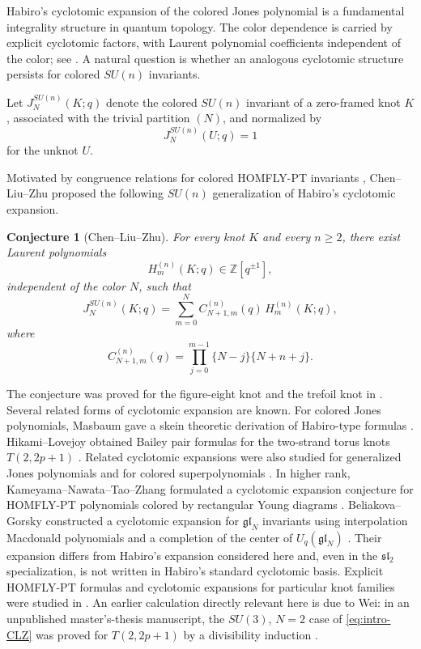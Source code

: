 \documentclass[11pt]{amsart}
\newtheorem{conjecture}[theorem]{Conjecture}
\begin{document}
Habiro's cyclotomic expansion of the colored Jones polynomial is a
fundamental integrality structure in quantum topology. 
The color dependence is carried by explicit cyclotomic factors, with
Laurent polynomial coefficients independent of the color; 
see \cite{HabiroSL2,HabiroCyclotomic,Habiro,HabiroLe}.
A natural question is whether an analogous cyclotomic structure persists
for colored \(SU(n)\) invariants.

Let \(J_N^{SU(n)}(K;q)\) denote the
colored \(SU(n)\) invariant of a zero-framed knot \(K\), associated with the
trivial partition \((N)\), and normalized by
\[
J_N^{SU(n)}(U;q)=1
\]
for the unknot \(U\).  

Motivated by congruence relations for colored HOMFLY-PT invariants \cite{CLPZ,ZhuStructures},
Chen--Liu--Zhu proposed the following \(SU(n)\) generalization of
Habiro's cyclotomic expansion.

\begin{conjecture}[Chen--Liu--Zhu]\label{conj:CLZ}
For every knot \(K\) and every \(n\geq2\), there exist Laurent polynomials
\[
H_m^{(n)}(K;q)\in\mathbb Z[q^{\pm1}],
\]
independent of the color \(N\), such that
\begin{equation}\label{eq:intro-CLZ}
J_N^{SU(n)}(K;q)
=
\sum_{m=0}^{N}
C_{N+1,m}^{(n)}(q)\,H_m^{(n)}(K;q),
\end{equation}
where
\begin{equation}\label{eq:intro-C}
C_{N+1,m}^{(n)}(q)
=
\prod_{j=0}^{m-1}
\{N-j\}\{N+n+j\}.
\end{equation}
\end{conjecture}

The conjecture was proved for the figure-eight knot and the trefoil knot in \cite{CLZ}.
Several related forms of cyclotomic expansion are known.  
For colored Jones polynomials, Masbaum gave a skein theoretic derivation of Habiro-type formulas \cite{Masbaum}. 
Hikami--Lovejoy obtained Bailey pair formulas for the two-strand torus knots \(T(2,2p+1)\) \cite{HikamiLovejoy}.
Related cyclotomic expansions were also studied for generalized Jones polynomials \cite{BerestGallagherSamuelson} and for colored superpolynomials \cite{ChenSuper}.
In higher rank, Kameyama--Nawata--Tao--Zhang formulated a cyclotomic expansion conjecture for HOMFLY-PT polynomials colored by rectangular Young diagrams \cite{KNTZ}.
Beliakova--Gorsky constructed a cyclotomic expansion for \(\mathfrak{gl}_N\) invariants using interpolation Macdonald polynomials and a completion of the center of \(U_q(\mathfrak{gl}_N)\) \cite{BeliakovaGorsky}.  
Their expansion differs from Habiro's expansion considered here and, even in the \(\mathfrak{sl}_2\) specialization, is not written in Habiro's standard cyclotomic basis.
Explicit HOMFLY-PT formulas and cyclotomic expansions for particular knot families were studied in \cite{CLZDoubleTwist,Kawagoe,KawagoeTwist}.
An earlier calculation directly relevant here is due to Wei: in an unpublished master's-thesis manuscript, the \(SU(3)\), \(N=2\) case of \eqref{eq:intro-CLZ} was proved for \(T(2,2p+1)\) by a divisibility induction \cite{Wei}.  
\end{document}
